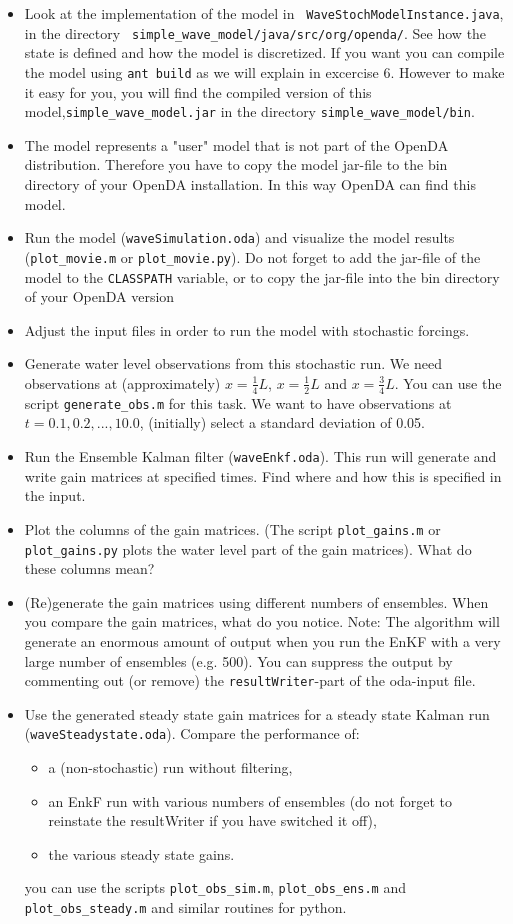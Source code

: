 \documentclass[a4paper,10pt]{article}
\begin{document}
\begin{itemize}
\item Look at the implementation of the model in {\tt
  WaveStochModelInstance.java}, in the directory {\tt
  simple\_wave\_model/java/src/org/openda/}. See how the state is defined and how
  the model is discretized. If you want you can compile the model using {\tt ant
  build} as we will explain in excercise 6. However to make it easy for you, you
  will find the compiled version of this model,{\tt simple\_wave\_model.jar} in
  the directory {\tt simple\_wave\_model/bin}.
\item The model represents a "user" model that is not part of the OpenDA distribution. Therefore you have to copy the
 model jar-file to the bin directory of your OpenDA installation. In this way OpenDA can find this model.
\item Run the model ({\tt waveSimulation.oda}) and visualize the model results
  ({\tt plot\_movie.m} or {\tt plot\_movie.py}). Do not forget to add the jar-file of the model to the
  {\tt CLASSPATH} variable, or to copy the jar-file into the bin directory of
  your OpenDA version
\item Adjust the input files in order to run the model with stochastic
  forcings.
\item Generate water level observations from this stochastic run. We need
  observations at (approximately) $x=\frac{1}{4} L$, $x=\frac{1}{2} L$ and
  $x=\frac{3}{4} L$. You can use the script {\tt generate\_obs.m} for this
  task. We want to have observations at $t=0.1, 0.2,...,10.0$, (initially)
  select a standard deviation of 0.05.
\item Run the Ensemble Kalman filter ({\tt waveEnkf.oda}). This run will
  generate and write gain matrices at specified times. Find where and how this
  is specified in the input.
\item Plot the columns of the gain matrices. (The script {\tt plot\_gains.m}
  or {\tt plot\_gains.py}
  plots the water level part of the gain matrices). What do these columns mean?
\item (Re)generate the gain matrices using different numbers of ensembles. When
  you compare the gain matrices, what do you notice. Note: The algorithm will
  generate an enormous amount of output when you run the EnKF with a very large
  number of ensembles (e.g. 500). You can suppress the output by commenting out
  (or remove) the {\tt resultWriter}-part of the oda-input file.
\item Use the generated steady state gain matrices for a steady state Kalman
  run ({\tt waveSteadystate.oda}). Compare the performance of:
  \begin{itemize}
  \item a (non-stochastic) run without filtering,
  \item an EnkF run with various numbers of ensembles (do not forget to
    reinstate the resultWriter if you have switched it off),
  \item the various steady state gains.
  \end{itemize}
 you can use the scripts {\tt plot\_obs\_sim.m}, {\tt plot\_obs\_ens.m}
 and\\ {\tt plot\_obs\_steady.m} and similar routines for python.


\end{itemize}
\end{document}
